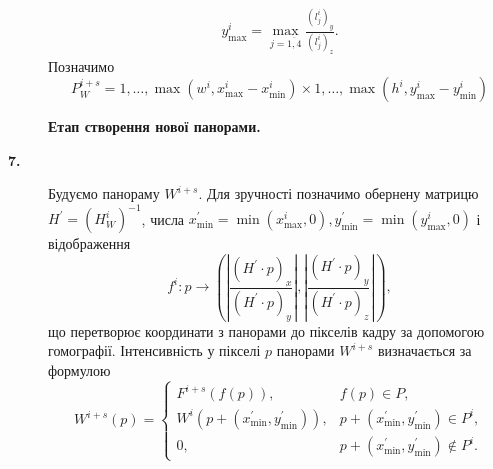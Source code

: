 \begin{description}
\begin{multline*}
            y_{\max}^{i} = \max_{j = \overline{1,4}}\frac{( l_{j}^{i} )_{y}}{( l_{j}^{i} )_{z}}.
        \end{multline*}
        Позначимо
        \begin{equation*}
            P_{W}^{i + s} =
            { 1,\ldots,\max( w^{i},x_{\max}^{i} - x_{\min}^{i} ) }
            \times
            { 1,\ldots,\max( h^{i},y_{\max}^{i} - y_{\min}^{i} ) }
        \end{equation*}
    \item[] \textbf{Етап створення нової панорами.}
    \item[\textbf{7.}]
        Будуємо панораму $W^{i+s}$. Для зручності позначимо обернену матрицю \\
        $H^{'} = (H_{W}^{i})^{-1}$, числа
        $x_{\min}^{'} = \min(x_{\max}^{i}, 0), y_{\min}^{'} = \min(y_{\max}^{i}, 0)$ і відображення
        \begin{equation*}
            f^i: p \rightarrow
            \left( \left| \frac{(H^{'} \cdot p)_x}{(H^{'} \cdot p)_y} \right|, \left| \frac{(H^{'} \cdot p)_y}{(H^{'} \cdot p)_z} \right| \right),
        \end{equation*}
        що перетворює координати з панорами до пікселів кадру за допомогою гомографії.
        Інтенсивність у пікселі $p$ панорами
        $W^{i+s}$ визначається за формулою
        \begin{equation*}
            W^{i + s}(p) =
            \begin{cases}
                F^{i + s}(f(p)),                            & f(p) \in P,                                    \\
                W^{i}( p + ( x_{\min}^{'},y_{\min}^{'} ) ), & p + ( x_{\min}^{'},y_{\min}^{'} ) \in P^{i},   \\
                0,                                          & p + ( x_{\min}^{'},y_{\min}^{'} ) \notin P^{i}.
            \end{cases}
        \end{equation*}
\end{description}

\clearpage
